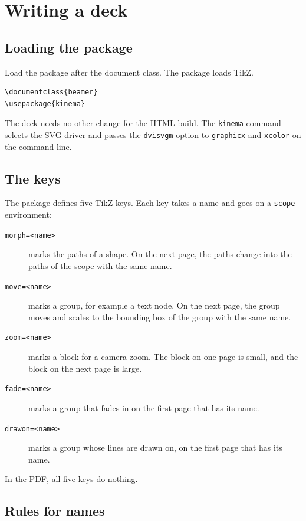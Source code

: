 \documentclass[11pt]{article}
\newcommand{\cmd}[1]{\texttt{#1}}
\begin{document}
\section{Writing a deck}

\subsection{Loading the package}

Load the package after the document class. The package loads TikZ.
\begin{lstlisting}
\documentclass{beamer}
\usepackage{kinema}
\end{lstlisting}
The deck needs no other change for the HTML build. The \cmd{kinema} command
selects the SVG driver and passes the \cmd{dvisvgm} option to \cmd{graphicx} and
\cmd{xcolor} on the command line.

\subsection{The keys}

The package defines five TikZ keys. Each key takes a name and goes on a
\cmd{scope} environment:

\begin{description}
	\item[\cmd{morph=<name>}] marks the paths of a shape. On the next page, the
	      paths change into the paths of the scope with the same name.
	\item[\cmd{move=<name>}] marks a group, for example a text node. On the next
	      page, the group moves and scales to the bounding box of the group with the
	      same name.
	\item[\cmd{zoom=<name>}] marks a block for a camera zoom. The block on one
	      page is small, and the block on the next page is large.
	\item[\cmd{fade=<name>}] marks a group that fades in on the first page that has
	      its name.
	\item[\cmd{drawon=<name>}] marks a group whose lines are drawn on, on the first
	      page that has its name.
\end{description}

In the PDF, all five keys do nothing.

\subsection{Rules for names}
\end{document}
